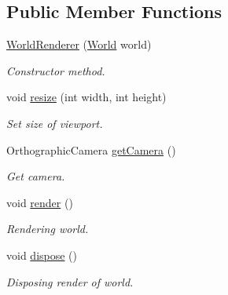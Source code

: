 \subsection*{Public Member Functions}
\begin{DoxyCompactItemize}
\item 
\hyperlink{classnl_1_1arjanfrans_1_1mario_1_1view_1_1WorldRenderer_ae3b0ff5bd619324e74a6656c2a380fc1}{World\+Renderer} (\hyperlink{classnl_1_1arjanfrans_1_1mario_1_1model_1_1World}{World} world)
\begin{DoxyCompactList}\small\item\em Constructor method. \end{DoxyCompactList}\item 
void \hyperlink{classnl_1_1arjanfrans_1_1mario_1_1view_1_1WorldRenderer_a10dcf6ac3ca6c2591648eb560fabb98e}{resize} (int width, int height)
\begin{DoxyCompactList}\small\item\em Set size of viewport. \end{DoxyCompactList}\item 
Orthographic\+Camera \hyperlink{classnl_1_1arjanfrans_1_1mario_1_1view_1_1WorldRenderer_a47406049241a1fef9c68ca9d80db2ee1}{get\+Camera} ()
\begin{DoxyCompactList}\small\item\em Get camera. \end{DoxyCompactList}\item 
\mbox{\label{classnl_1_1arjanfrans_1_1mario_1_1view_1_1WorldRenderer_a98341e31f35df9224c43d6a60c4098b4}} 
void \hyperlink{classnl_1_1arjanfrans_1_1mario_1_1view_1_1WorldRenderer_a98341e31f35df9224c43d6a60c4098b4}{render} ()
\begin{DoxyCompactList}\small\item\em Rendering world. \end{DoxyCompactList}\item 
\mbox{\label{classnl_1_1arjanfrans_1_1mario_1_1view_1_1WorldRenderer_a55569f6e8d3f0b9114d7789a6e86fff4}} 
void \hyperlink{classnl_1_1arjanfrans_1_1mario_1_1view_1_1WorldRenderer_a55569f6e8d3f0b9114d7789a6e86fff4}{dispose} ()
\begin{DoxyCompactList}\small\item\em Disposing render of world. \end{DoxyCompactList}\end{DoxyCompactItemize}
